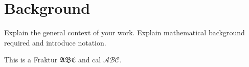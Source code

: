 \chapter{Background}\label{chap:background}
Explain the general context of your work.
Explain mathematical background required and introduce notation.

This is a Fraktur $\mathfrak{ABC}$ and cal $\mathcal{ABC}$.


